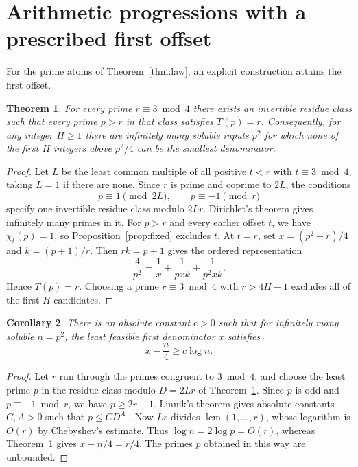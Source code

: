 \documentclass[11pt,a4paper]{article}
\newtheorem{theorem}{Theorem}
\newtheorem{corollary}[theorem]{Corollary}
\theoremstyle{definition}
\begin{document}
\section{Arithmetic progressions with a prescribed first offset}

For the prime atoms of Theorem~\ref{thm:law}, an explicit construction
attains the first offset.

\begin{theorem}\label{thm:construction}
For every prime \(r\equiv3\bmod4\) there exists an invertible residue
class such that every prime \(p>r\) in that class satisfies \(T(p)=r\).
Consequently, for any integer \(H\ge1\) there are infinitely many
soluble inputs \(p^2\) for which none of the first \(H\) integers
above \(p^2/4\) can be the smallest denominator.
\end{theorem}

\begin{proof}
Let \(L\) be the least common multiple of all positive
\(t<r\) with \(t\equiv3\bmod4\), taking \(L=1\) if there are none.
Since \(r\) is prime and coprime to \(2L\), the conditions
\[
  p\equiv1\pmod{2L},\qquad p\equiv-1\pmod r
\]
specify one invertible residue class modulo \(2Lr\).
Dirichlet's theorem gives infinitely many primes in it. For \(p>r\)
and every earlier offset \(t\), we have \(\chi_t(p)=1\), so
Proposition~\ref{prop:fixed} excludes \(t\).
At \(t=r\), set \(x=(p^2+r)/4\) and \(k=(p+1)/r\). Then \(rk=p+1\)
gives the ordered representation
\[
  \frac4{p^2}=\frac1x+\frac1{pxk}+\frac1{p^2xk}.
\]
Hence \(T(p)=r\). Choosing a prime \(r\equiv3\bmod4\) with
\(r>4H-1\) excludes all of the first \(H\) candidates.
\end{proof}

\begin{corollary}\label{cor:quant}
There is an absolute constant \(c>0\) such that for infinitely many
soluble \(n=p^2\), the least feasible first denominator \(x\) satisfies
\[
  x-\frac n4\ge c\log n .
\]
\end{corollary}

\begin{proof}
Let \(r\) run through the primes congruent to \(3\bmod4\), and choose
the least prime \(p\) in the residue class modulo \(D=2Lr\) of
Theorem~\ref{thm:construction}. Since \(p\) is odd and
\(p\equiv-1\bmod r\), we have \(p\ge2r-1\). Linnik's theorem gives
absolute constants \(C,A>0\) such that \(p\le CD^A\)
\cite{heathbrown}. Now \(Lr\) divides \(\operatorname{lcm}(1,\ldots,r)\),
whose logarithm is \(O(r)\) by Chebyshev's estimate. Thus
\(\log n=2\log p=O(r)\), whereas Theorem~\ref{thm:construction}
gives \(x-n/4=r/4\). The primes \(p\) obtained in this way are
unbounded.
\end{proof}
\end{document}
